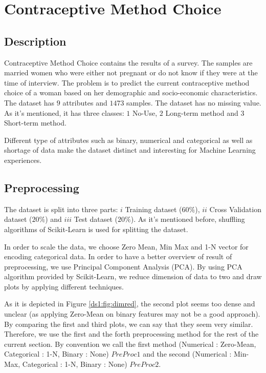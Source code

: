 \section{Contraceptive Method Choice}
\label{db:sec:ds1}
\subsection{Description}
Contraceptive Method Choice contains the results of a survey. The samples are married women who were either not pregnant or do not know if they were at the time of interview. The problem is to predict the current contraceptive method choice of a woman based on her demographic and socio-economic characteristics. The dataset has $9$ attributes and $1473$ samples. The dataset has no missing value. As it's mentioned, it has three classes: $1$ No-Use, $2$ Long-term method and $3$ Short-term method.

Different type of attributes such as binary, numerical and categorical as well as shortage of data make the dataset distinct and interesting for Machine Learning experiences.

\subsection{Preprocessing}
The dataset is split into three parts: $i$ Training dataset ($60\%$), $ii$ Cross Validation dataset ($20\%$) and $iii$ Test dataset ($20\%$). As it's mentioned before, shuffling algorithms of Scikit-Learn is used for splitting the dataset.

In order to scale the data, we choose Zero Mean, Min Max and 1-N vector for encoding categorical data. In order to have a better overview of result of preprocessing, we use Principal Component Analysis (PCA). By using PCA algorithm provided by Scikit-Learn, we reduce dimension of data to two and draw plots by applying different techniques. 

As it is depicted in Figure \ref{ds1:fig:dimred}, the second plot seems too dense and unclear (as applying Zero-Mean on binary features may not be a good approach). By comparing the first and third plots, we can say that they seem very similar. Therefore, we use the first and the forth preprocessing method for the rest of the current section. By convention we call the first method (Numerical : Zero-Mean, Categorical : 1-N, Binary : None) $PreProc1$ and the second (Numerical : Min-Max, Categorical : 1-N, Binary : None) $PreProc2$.

